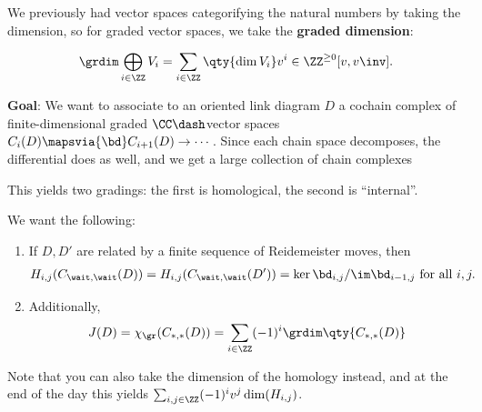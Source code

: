 We previously had vector spaces categorifying the natural numbers by
taking the dimension, so for graded vector spaces, we take the
\textbf{graded dimension}:

\begin{definition}

\begin{align*}
\grdim \bigoplus_{i\in\ZZ}V_i = \sum_{i\in \ZZ}\qty{\dim V_i}v^i \in \ZZ^{\geq 0}[v, v\inv]
.\end{align*}

\end{definition}

\textbf{Goal}: We want to associate to an oriented link diagram \(D\) a
cochain complex of finite-dimensional graded \(\CC\dash\)vector spaces
\(C_i(D) \mapsvia{\bd} C_{i+1}(D) \to \cdots\). Since each chain space
decomposes, the differential does as well, and we get a large collection
of chain complexes

\begin{center}\end{center}

This yields two gradings: the first is homological, the second is
``internal''.

\begin{remark}

We want the following:

\begin{enumerate}
\def\labelenumi{\arabic{enumi}.}
\item
  If \(D, D'\) are related by a finite sequence of Reidemeister moves,
  then
  \begin{align*}
  H_{i, j}(C_{\wait, \wait}(D)) = H_{i, j}(C_{\wait, \wait}(D')) = \ker \bd_{i, j} / \im \bd_{i-1, j} \text{ for all }i, j.
  \end{align*}
\item
  Additionally,
  \begin{align*}
  J(D) = \chi_{\gr}(C_{*, *}(D)) = \sum_{i\in \ZZ} (-1)^i \grdim \qty{ C_{*, *}(D) }
  \end{align*}
\end{enumerate}

Note that you can also take the dimension of the homology instead, and
at the end of the day this yields
\(\sum_{i, j\in \ZZ} (-1)^i v^j \dim(H_{i, j})\).

\end{remark}

